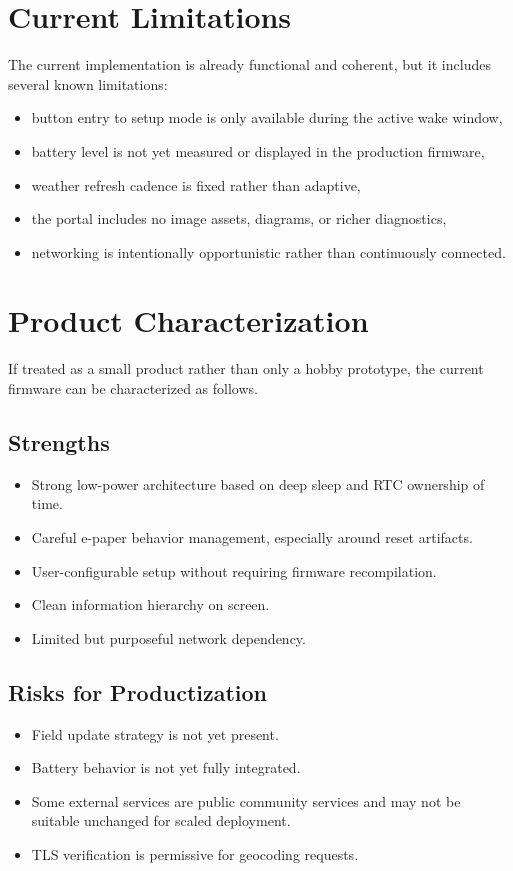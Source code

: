 \documentclass[11pt]{article}
\begin{document}
\section{Current Limitations}
The current implementation is already functional and coherent, but it includes several known limitations:
\begin{itemize}
  \item button entry to setup mode is only available during the active wake window,
  \item battery level is not yet measured or displayed in the production firmware,
  \item weather refresh cadence is fixed rather than adaptive,
  \item the portal includes no image assets, diagrams, or richer diagnostics,
  \item networking is intentionally opportunistic rather than continuously connected.
\end{itemize}

\section{Product Characterization}
If treated as a small product rather than only a hobby prototype, the current firmware can be characterized as follows.

\subsection{Strengths}
\begin{itemize}
  \item Strong low-power architecture based on deep sleep and RTC ownership of time.
  \item Careful e-paper behavior management, especially around reset artifacts.
  \item User-configurable setup without requiring firmware recompilation.
  \item Clean information hierarchy on screen.
  \item Limited but purposeful network dependency.
\end{itemize}

\subsection{Risks for Productization}
\begin{itemize}
  \item Field update strategy is not yet present.
  \item Battery behavior is not yet fully integrated.
  \item Some external services are public community services and may not be suitable unchanged for scaled deployment.
  \item TLS verification is permissive for geocoding requests.
\end{itemize}
\end{document}
